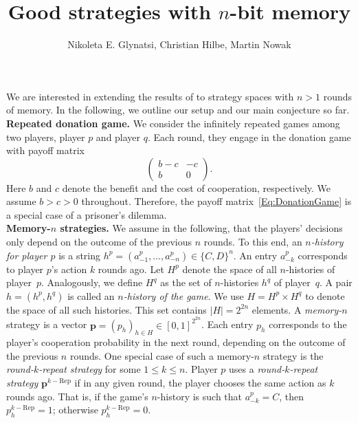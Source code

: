 \documentclass{article}
\title{\vspace{-2cm} Good strategies with $n$-bit memory}
\author{Nikoleta E. Glynatsi, Christian Hilbe, Martin Nowak}
\date{}
\theoremstyle{definition}
\begin{document}
\maketitle

\onehalfspacing

\noindent
We are interested in extending the results of \citep{akin:EGADS:2016} to strategy spaces with $n\!>\!1$ rounds of memory. 
In the following, we outline our setup and our main conjecture so far.\\

\noindent
{\bf Repeated donation game.} We consider the infinitely repeated games among two players, player $p$ and player $q$. 
Each round, they engage in the donation game with payoff matrix
\begin{equation} \label{Eq:DonationGame}
\left(
\begin{array}{cc}
b-c	&-c\\
b	&0
\end{array}
\right).
\end{equation}
Here $b$ and $c$ denote the benefit and the cost of cooperation, respectively. 
We assume $b\!>\!c\!>\!0$ throughout. 
Therefore, the payoff matrix~\eqref{Eq:DonationGame} is a special case of a prisoner's dilemma.\\

\noindent
{\bf Memory-$n$ strategies.} We assume in the following, that the players' decisions only depend on the outcome of the previous $n$ rounds. 
To this end, an {\it $n$-history for player $p$} is a string $h^p=(a^p_{-1},\ldots,a^p_{-n})\!\in\!\{C,D\}^n$. 
An entry $a^p_{-k}$ corresponds to player $p$'s action $k$ rounds ago. 
Let $H^p$ denote the space of all $n$-histories of player~$p$. 
Analogously, we define $H^q$ as the set of $n$-histories $h^q$ of player~$q$. 
A pair $h\!=\!(h^p,h^q)$ is called an {\it $n$-history of the game}. 
We use $H=H^p\times H^q$ to denote the space of all such histories. 
This set contains $|H|=2^{2n}$ elements. 
A {\it memory-$n$} strategy is a vector $\mathbf{p}=(p_h)_{h\in H}\in[0,1]^{2^{2n}}$. 
Each entry $p_h$ corresponds to the player's cooperation probability in the next round, depending on the outcome of the previous $n$ rounds. 
One special case of such a memory-$n$ strategy is the  {\it round-$k$-repeat strategy} for some $1\!\le\!k\!\le\!n$. 
Player $p$ uses a {\it round-$k$-repeat strategy} $\mathbf{p}^{k-\text{Rep}}$ if in any given round, the player chooses the same action as $k$ rounds ago. That is, if the game's $n$-history is such that $a^p_{-k}\!=\!C$, then $p^{k-\text{Rep}}_h\!=\!1$; otherwise $p^{k-\text{Rep}}_h\!=\!0$.
\end{document}
